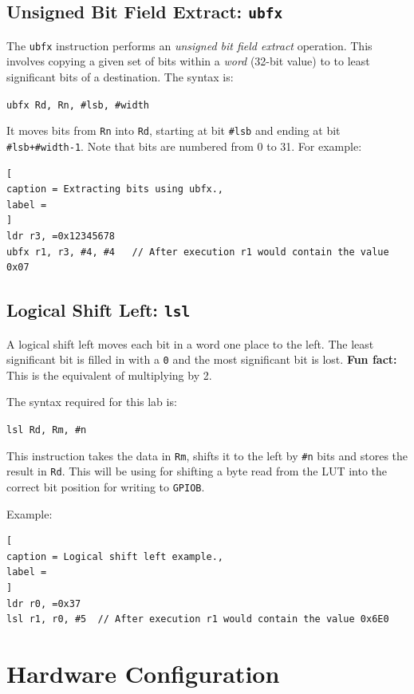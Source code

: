 \documentclass{UoNMCHA}
\numberwithin{equation}{section}
\begin{document}
\subsection{Unsigned Bit Field Extract: \texttt{ubfx}}

The \texttt{ubfx} instruction performs an \textit{unsigned bit field extract} operation. This involves copying a given set of bits within a \textit{word} (32-bit value) to to least significant bits of a destination. The syntax is:

\texttt{ubfx Rd, Rn, \#lsb, \#width}

It moves bits from \texttt{Rn} into \texttt{Rd}, starting at bit \texttt{\#lsb} and ending at bit \texttt{\#lsb+\#width-1}. Note that bits are numbered from 0 to 31. For example:

\begin{lstlisting}[
caption = Extracting bits using ubfx.,
label = 
]
ldr r3, =0x12345678
ubfx r1, r3, #4, #4   // After execution r1 would contain the value 0x07
\end{lstlisting}

\subsection{Logical Shift Left: \texttt{lsl}}

A logical shift left moves each bit in a word one place to the left. The least significant bit is filled in with a \texttt{0} and the most significant bit is lost. \textbf{Fun fact:} This is the equivalent of multiplying by 2.

The syntax required for this lab is:

\texttt{lsl Rd, Rm, \#n}

This instruction takes the data in \texttt{Rm}, shifts it to the left by \texttt{\#n} bits and stores the result in \texttt{Rd}. This will be using for shifting a byte read from the LUT into the correct bit position for writing to \texttt{GPIOB}.

Example:

\begin{lstlisting}[
caption = Logical shift left example.,
label = 
]
ldr r0, =0x37
lsl r1, r0, #5  // After execution r1 would contain the value 0x6E0

\end{lstlisting}


\section{Hardware Configuration}
\end{document}
